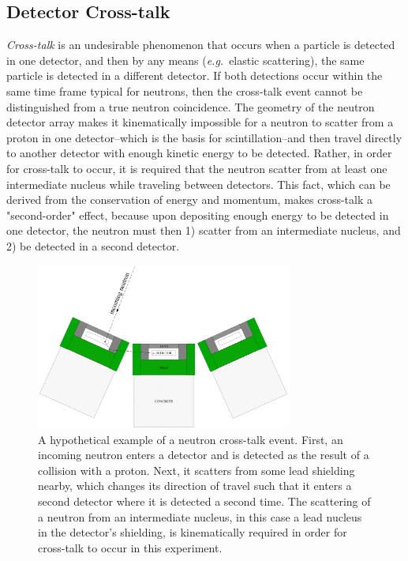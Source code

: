 \subsection{Detector Cross-talk}
\label{crosstalk}
\textit{Cross-talk} is an undesirable phenomenon that occurs when a particle is detected in one detector, and then by any means (\textit{e.g.}\ elastic scattering), the same particle is detected in a different detector.
If both detections occur within the same time frame typical for neutrons, then the cross-talk event cannot be distinguished from a true neutron coincidence.
The geometry of the neutron detector array makes it kinematically impossible for a neutron to scatter from a proton in one detector--which is the basis for scintillation--and then travel directly to another detector with enough kinetic energy to be detected.
Rather, in order for cross-talk to occur, it is required that the neutron scatter from at least one intermediate nucleus while traveling between detectors.
This fact, which can be derived from the conservation of energy and momentum, makes cross-talk a "second-order" effect, because upon depositing enough energy to be detected in one detector, the neutron must then 1) scatter from an intermediate nucleus, and 2) be detected in a second detector.
\begin{figure}
    \centering
    \includegraphics[width = 0.75\textwidth]{Content/Errors/CrossTalkExample.png}
    \caption{A hypothetical example of a neutron cross-talk event.
First, an incoming neutron enters a detector and is detected as the result of a collision with a proton.
Next, it scatters from some lead shielding nearby, which changes its direction of travel such that it enters a second detector where it is detected a second time.
The scattering of a neutron from an intermediate nucleus, in this case a lead nucleus in the detector's shielding, is kinematically required in order for cross-talk to occur in this experiment.}
    \label{fig:CrossTalkExamplepng}
\end{figure}
